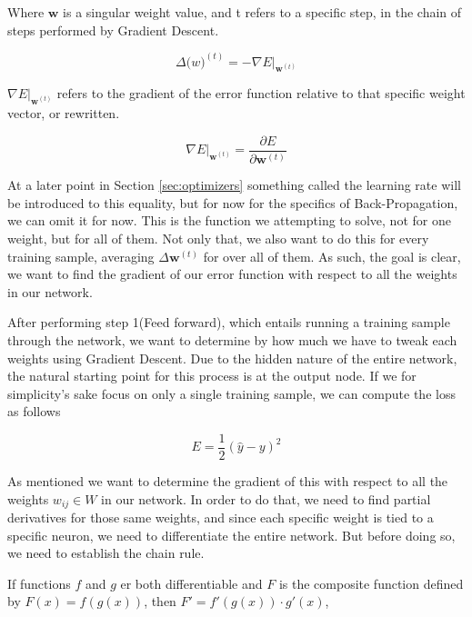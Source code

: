 Where $\mathbf{w}$ is a singular weight value, and t refers to a specific step,
in the chain of steps performed by Gradient Descent.

\begin{equation}
    \Delta \mathbf(w)^{(t)} = -\nabla E|_{\mathbf{w}^{(t)}}
\end{equation}

$\nabla E|_{\mathbf{w}^{(t)}}$ refers to the gradient of the
error function relative to that specific weight vector, or rewritten.

$$
\nabla E|_{\mathbf{w}^{(t)}} = \frac{\partial E}{\partial \mathbf{w}^{(t)}}
$$

At a later point in Section \ref{sec:optimizers} something called the learning
rate will be introduced to this equality, but for now for the specifics of
Back-Propagation, we can omit it for now. This is the function we attempting to
solve, not for one weight, but for all of them. Not only that, we also want to
do this for every training sample, averaging $\Delta \mathbf{w}^{(t)}$ for over all
of them. As such, the goal is clear, we want to find the gradient of our error
function with respect to all the weights in our network.

After performing step 1(Feed forward), which entails running a training sample
through the network, we want to determine by how much we have to tweak each
weights using Gradient Descent. Due to the hidden nature of the entire network,
the natural starting point for this process is at the output node. If we for
simplicity's sake focus on only a single training sample, we can compute the
loss as follows

$$
E = \frac{1}{2}(\hat{y} - y)^2
$$

As mentioned we want to determine the gradient of this with respect to all the
weights $w_{ij} \in W$ in our network. In order to do that, we need to find
partial derivatives for those same weights, and since each specific weight is
tied to a specific neuron, we need to differentiate the entire network. But
before doing so, we need to establish the chain rule.

\begin{lemma}
\label{lemma:chainrule}

    If functions $f$ and $g$ er both differentiable and $F$ is the composite
    function defined by $F(x) = f(g(x))$, then $F' = f'(g(x)) \cdot g'(x)$,

\end{lemma}

